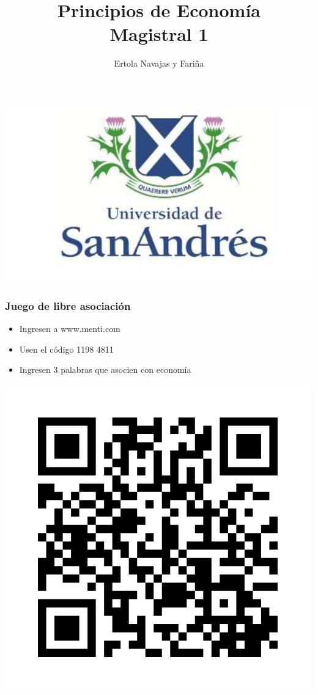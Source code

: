 \documentclass{beamer}
\title[Principios de Economía]{Principios de Economía \vspace{4mm}
\\ Magistral 1}
\date{}
\author[Ertola Navajas y Fariña]{Ertola Navajas y Fariña}
\institute[]{Universidad de San Andrés}
\begin{document}
\begin{frame}
\titlepage
\centering
\includegraphics[scale=0.2]{Slides Principios de Economia/Figures/logoUDESA.jpg} 
\end{frame}


\begin{frame}
\frametitle{Juego de libre asociación}
\begin{itemize}
    \item Ingresen a www.menti.com
    \item Usen el código  1198 4811
    \item Ingresen 3 palabras que asocien con economía
\end{itemize} 
    \begin{center}
    \includegraphics[scale=0.2]{Slides Principios de Economia/Figures/menti.png}
    \end{center}
\end{frame}
\end{document}
